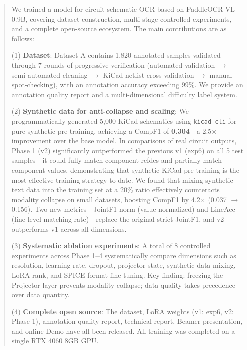 
\begin{abstract}
We trained a model for circuit schematic OCR based on PaddleOCR-VL-0.9B, covering dataset construction, multi-stage controlled experiments, and a complete open-source ecosystem. The main contributions are as follows:

(1) \textbf{Dataset}: Dataset A contains 1,820 annotated samples validated through 7 rounds of progressive verification (automated validation $\to$ semi-automated cleaning $\to$ KiCad netlist cross-validation $\to$ manual spot-checking), with an annotation accuracy exceeding 99\%. We provide an annotation quality report and a multi-dimensional difficulty label system.

(2) \textbf{Synthetic data for anti-collapse and scaling}: We programmatically generated 5,000 KiCad schematics using \texttt{kicad-cli} for pure synthetic pre-training, achieving a CompF1 of \textbf{0.304}---a 2.5$\times$ improvement over the base model. In comparisons of real circuit outputs, Phase 1 (v2) significantly outperformed the previous v1 (exp6) on all 5 test samples---it could fully match component refdes and partially match component values, demonstrating that synthetic KiCad pre-training is the most effective training strategy to date. We found that mixing synthetic text data into the training set at a 20\% ratio effectively counteracts modality collapse on small datasets, boosting CompF1 by 4.2$\times$ (0.037 $\to$ 0.156). Two new metrics---JointF1-norm (value-normalized) and LineAcc (line-level matching rate)---replace the original strict JointF1, and v2 outperforms v1 across all dimensions.

(3) \textbf{Systematic ablation experiments}: A total of 8 controlled experiments across Phase 1--4 systematically compare dimensions such as resolution, learning rate, dropout, projector state, synthetic data mixing, LoRA rank, and SPICE format fine-tuning. Key finding: freezing the Projector layer prevents modality collapse; data quality takes precedence over data quantity.

(4) \textbf{Complete open source}: The dataset, LoRA weights (v1: exp6, v2: Phase 1), annotation quality report, technical report, Beamer presentation, and online Demo have all been released. All training was completed on a single RTX 4060 8GB GPU.
\end{abstract}



